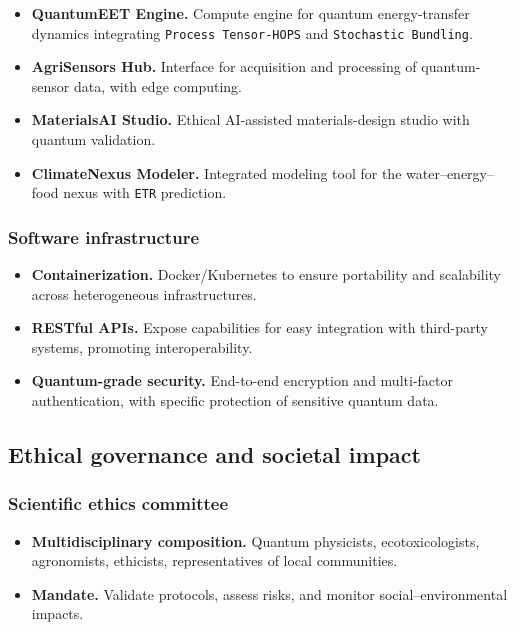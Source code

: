 \documentclass[12pt, a4paper]{article}
\begin{document}
\begin{itemize}
    \item \textbf{QuantumEET Engine.} Compute engine for quantum energy-transfer dynamics integrating \texttt{Process Tensor-HOPS} and \texttt{Stochastic Bundling}.
    
    \item \textbf{AgriSensors Hub.} Interface for acquisition and processing of quantum-sensor data, with edge computing.
    
    \item \textbf{MaterialsAI Studio.} Ethical AI-assisted materials-design studio with quantum validation.
    
    \item \textbf{ClimateNexus Modeler.} Integrated modeling tool for the water–energy–food nexus with \texttt{ETR} prediction.
\end{itemize}

\subsubsection{Software infrastructure}

\begin{itemize}
    \item \textbf{Containerization.} Docker/Kubernetes to ensure portability and scalability across heterogeneous infrastructures.
    
    \item \textbf{RESTful APIs.} Expose capabilities for easy integration with third-party systems, promoting interoperability.
    
    \item \textbf{Quantum-grade security.} End-to-end encryption and multi-factor authentication, with specific protection of sensitive quantum data.
\end{itemize}

\subsection{Ethical governance and societal impact}

\subsubsection{Scientific ethics committee}

\begin{itemize}
    \item \textbf{Multidisciplinary composition.} Quantum physicists, ecotoxicologists, agronomists, ethicists, representatives of local communities.
    
    \item \textbf{Mandate.} Validate protocols, assess risks, and monitor social–environmental impacts.
\end{itemize}
\end{document}
